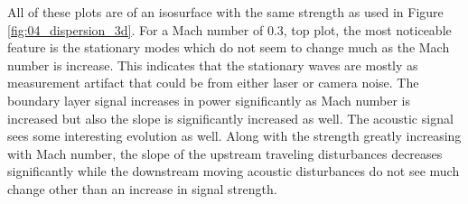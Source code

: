 All of these plots are of an isosurface with the same strength as used in Figure \ref{fig:04_dispersion_3d}.
For a Mach number of 0.3, top plot, the most noticeable feature is the stationary modes which do not seem to change much as the Mach number is increase.
This indicates that the stationary waves are mostly as measurement artifact that could be from either laser or camera noise.
The boundary layer signal increases in power significantly as Mach number is increased but also the slope is significantly increased as well.
The acoustic signal sees some interesting evolution as well.
Along with the strength greatly increasing with Mach number, the slope of the upstream traveling disturbances decreases significantly while the downstream moving acoustic disturbances do not see much change other than an increase in signal strength.

